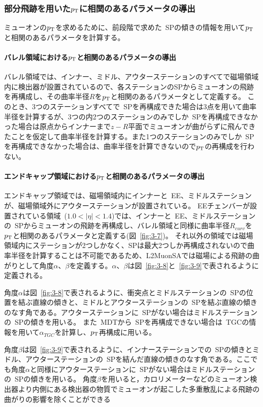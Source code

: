 \subsubsection{部分飛跡を用いた$p_\mathrm{T}$に相関のあるパラメータの導出}
ミューオンの$p_\mathrm{T}$を求めるために、前段階で求めた~SPの傾きの情報を用いて$p_\mathrm{T}$と相関のあるパラメータを計算する。

\paragraph{バレル領域における$p_\mathrm{T}$と相関のあるパラメータの導出}
バレル領域では、インナー、ミドル、アウターステーションのすべてで磁場領域内に検出器が設置されているので、各ステーションのSPからミューオンの飛跡を再構成し、その曲率半径$R$を$p_\mathrm{T}$と相関のあるパラメータとして定義する。
このとき、3つのステーションすべてで~SPを再構成できた場合は3点を用いて曲率半径を計算するが、3つの内2つのステーションのみでしか~SPを再構成できなかった場合は原点からインナーまで$z-R$平面でミューオンが曲がらずに飛んできたことを仮定して曲率半径を計算する。また1つのステーションのみでしか~SPを再構成できなかった場合は、曲率半径を計算できないので$p_\mathrm{T}$の再構成を行わない。


\paragraph{エンドキャップ領域における$p_\mathrm{T}$と相関のあるパラメータの導出}
エンドキャップ領域では、磁場領域内にインナーと~EE、ミドルステーションが、磁場領域外にアウターステーションが設置されている。
EEチェンバーが設置されている領域~($1.0<|\eta|<1.4$)では、インナーと~EE、ミドルステーションの~SPからミューオンの飛跡を再構成し、バレル領域と同様に曲率半径$R_{curv}$を$p_\mathrm{T}$と相関のあるパラメータと定義する(図~\ref{fig:3-7})。
それ以外の領域では磁場領域内にステーションが2つしかなく、SPは最大2つしか再構成されないので曲率半径を計算することは不可能であるため、L2MuonSAでは磁場による飛跡の曲がりとして角度$\alpha$、$\beta$を定義する。$\alpha$、$\beta$は図~\ref{fig:3-8}と~\ref{fig:3-9}で表されるように定義される。

角度$\alpha$は図~\ref{fig:3-8}で表されるように、衝突点とミドルステーションの~SPの位置を結ぶ直線の傾きと、ミドルとアウターステーションの~SPを結ぶ直線の傾きのなす角である。アウターステーションに~SPがない場合はミドルステーションの~SPの傾きを用いる。
また~MDTから~SPを再構成できない場合は~TGCの情報を用いて$\alpha_{TGC}$を計算し、$p_\mathrm{T}$再構成に用いる。

角度$\beta$は図~\ref{fig:3-9}で表されるように、インナーステーションでの~SPの傾きとミドル、アウターステーションの~SPを結んだ直線の傾きのなす角である。ここでも角度$\alpha$と同様にアウターステーションに~SPがない場合はミドルステーションの~SPの傾きを用いる。
角度$\beta$を用いると，カロリメーターなどのミューオン検出器より内側にある検出器の物質でミューオンが起こした多重散乱による飛跡の曲がりの影響を除くことができる

